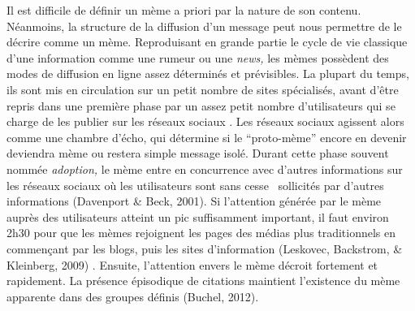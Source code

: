 Il est difficile de d\'efinir un m\`eme a priori par la nature de son contenu. N\'eanmoins, la structure de la diffusion d{\textquoteright}un message peut nous permettre de le d\'ecrire comme un m\`eme. Reproduisant en grande partie le cycle de vie classique d{\textquoteright}une information comme une rumeur ou une \textit{news, }les m\`emes poss\`edent des modes de diffusion en ligne assez d\'etermin\'es et pr\'evisibles. La plupart du temps, ils sont mis en circulation sur un petit nombre de sites sp\'ecialis\'es, avant d{\textquoteright}\^etre repris dans une premi\`ere phase par un assez petit nombre d{\textquoteright}utilisateurs qui se charge de les publier sur les r\'eseaux sociaux \cite{Bauckhage2011}. Les r\'eseaux sociaux agissent alors comme une chambre d{\textquoteright}\'echo, qui d\'etermine si le {\textquotedblleft}proto-m\`eme{\textquotedblright} encore en devenir deviendra m\`eme ou restera simple message isol\'e. Durant cette phase souvent nomm\'ee \textit{adoption,} le m\`eme entre en concurrence avec d{\textquoteright}autres informations sur les r\'eseaux sociaux o\`u les utilisateurs sont sans cesse \ sollicit\'es par d{\textquoteright}autres informations (Davenport \& Beck, 2001). Si l{\textquoteright}attention g\'en\'er\'ee par le m\`eme aupr\`es des utilisateurs atteint un pic suffisamment important, il faut environ 2h30 pour que les m\`emes rejoignent les pages des m\'edias plus traditionnels en commen\c{c}ant par les blogs, puis les sites d{\textquoteright}information (Leskovec, Backstrom, \& Kleinberg, 2009) . Ensuite, l{\textquoteright}attention envers le m\`eme d\'ecroit fortement et rapidement. La pr\'esence \'episodique de citations maintient l{\textquoteright}existence du m\`eme apparente dans des groupes d\'efinis (Buchel, 2012).
